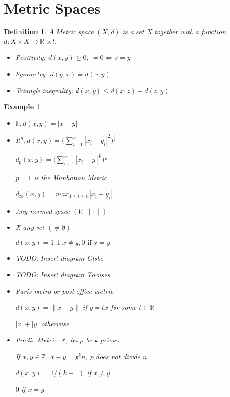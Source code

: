 \documentclass[twoside]{article}
\newcommand{\Z}{\mathbb{Z}}
\newtheorem{definition}[theorem]{Definition}
\newtheorem{example}[theorem]{Example}
\newcommand\R{\mathbb{R}}
\begin{document}


\section{Metric Spaces}

\begin{definition}
    A Metric space $(X,d)$ is a set $X$ together with a function $d : X \times X \rightarrow \R$ s.t.

    \begin{itemize}
        \item Positivity: $d(x,y) \geq 0$, $= 0 \iff x = y$
        \item Symmetry: $d(y,x) = d(x,y)$
        \item Triangle inequality: $d(x,y) \leq d(x,z) + d(z,y)$
    \end{itemize}
\end{definition}

\begin{example}
    \begin{itemize}
        \item $\R, d(x,y) = |x-y|$
        \item $R^n, d(x,y) = \big( \sum_{i+1}^n |x_i - y_i|^2\big)^{\frac12}$

        $d_p(x,y) = \big( \sum_{i+1}^n |x_i - y_i|^p\big)^{\frac1p}$
        
        $p = 1$ is the Manhattan Metric
        
        $d_{\infty} (x,y) = max_{1\leq i \leq n} |x_i - y_i|$
        \item Any normed space $(V, \|\cdot\|)$
        \item X any set $(\neq \emptyset)$


        $d(x,y) = 1 \text{ if } x \neq y, 0 \text{ if } x = y$

        \item TODO: Insert diagram Globe

        \item TODO: Insert diagram Toruses

        \item Paris metro or post office metric 

        $d(x,y) = \|x-y\| $ if $y = tx $ for some $t \in \R$

        $|x| + |y|$ otherwise 

        \item P-adic Metric: $\Z$, let $p$ be a prime. 

        If $x,y \in \Z$, $x - y = p^kn$, $p $ does not divide $n$

        $d(x,y) = 1/(k+1)$ if $x \neq y$

        $0$ if $x = y$
    \end{itemize}
\end{example}
\end{document}
